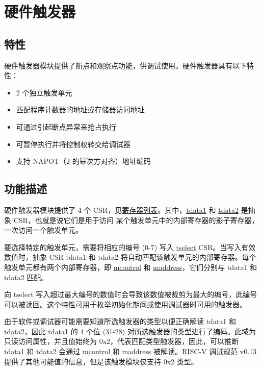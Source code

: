 \documentclass[main\_\_CN.tex]{subfiles}
\begin{document}

\clearpage
\section{硬件触发器}
\label{sec:riscvcpu-hwt}

\subsection{特性}
\label{sec:riscvcpu-hwt-features}

硬件触发器模块提供了断点和观察点功能，供调试使用。硬件触发器具有以下特性：

\begin{itemize}
    \item 2 个独立触发单元
    \item 匹配程序计数器的地址或存储器访问地址
    \item 可通过引起断点异常来抢占执行
    \item 可暂停执行并将控制权转交给调试器
    \item 支持 NAPOT（2 的幂次方对齐）地址编码
\end{itemize}

\subsection{功能描述}
\label{sec:riscvcpu-hwt-func-descr}

硬件触发器模块提供了 4 个 CSR，见\hyperref[sec:riscvcpu-hwt-reg-summ]{寄存器列表}。其中，\hyperref[regdesc:TDATA1]{tdata1} 和 \hyperref[regdesc:TDATA2]{tdata2} 是抽象 CSR，也就是说它们是用于访问 某个触发单元中的内部寄存器的影子寄存器，一次访问一个触发单元。

要选择特定的触发单元，需要将相应的编号 (0-7) 写入 \hyperref[regdesc:TSELECT]{tselect} CSR。当写入有效数值时，抽象 CSR tdata1 和 tdata2 将自动匹配该触发单元的内部寄存器。每个触发单元都有两个内部寄存器，即 \hyperref[regdesc:MCONTROL]{mcontrol} 和 \hyperref[regdesc:MADDRESS]{maddress}，它们分别与 tdata1 和 tdata2 匹配。

向 tselect 写入超过最大编号的数值时会导致该数值被裁剪为最大的编号，此编号可以被读回。这个特性可用于枚举初始化期间或使用调试器时可用的触发器。

由于软件或调试器可能需要知道所选触发器的类型以便正确解读 tdata1 和 tdata2，因此 tdata1 的 4 个位 (31-28) 对所选触发器的类型进行了编码。此域为只读访问属性，并且值始终为 0x2，代表匹配类型触发器，因此，可以推断 tdata1 和 tdata2 会通过 mcontrol 和 maddress 被解读。RISC-V 调试规范 v0.13 提供了其他可能值的信息，但是该触发模块仅支持 0x2 类型。
\end{document}
